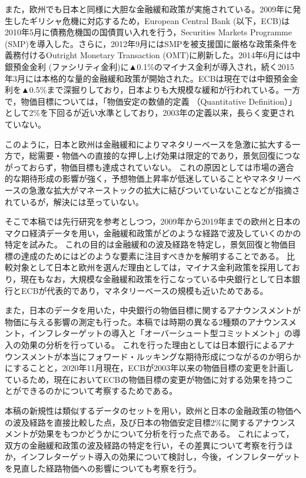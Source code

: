 \documentclass[12pt]{jarticle}
\begin{document}
{また，欧州でも日本と同様に大胆な金融緩和政策が実施されている。2009年に発生したギリシャ危機に対応するため，European Central Bank (以下，ECB)は2010年5月に債務危機国の国債買い入れを行う，Securities Markets Programme (SMP)を導入した。さらに，2012年9月にはSMPを被支援国に厳格な政策条件を義務付けるOutright Monetary Transaction (OMT)に刷新した。2014年6月には中銀預金金利 (ファシリティ金利)に▲0.1\%のマイナス金利が導入され，続く2015年3月には本格的な量的金融緩和政策が開始された。ECBは現在では中銀預金金利を▲0.5\%まで深掘りしており，日本よりも大規模な緩和が行われている。一方で，物価目標については，「物価安定の数値的定義 （Quantitative Definition）」として2\%を下回るが近い水準としており，2003年の定義以来，長らく変更されていない。

このように，日本と欧州は金融緩和によりマネタリーベースを急激に拡大する一方で，総需要・物価への直接的な押し上げ効果は限定的であり，景気回復につながっておらず，物価目標も達成されていない。
これの原因としては市場の適合的な期待形成の影響が強く，予想物価上昇率が低迷していることやマネタリーベースの急激な拡大がマネーストックの拡大に結びついていないことなどが指摘されているが，解決には至っていない。

そこで本稿では先行研究を参考としつつ，2009年から2019年までの欧州と日本のマクロ経済データを用い，金融緩和政策がどのような経路で波及していくのかの特定を試みた。
これの目的は金融緩和の波及経路を特定し，景気回復と物価目標の達成のためにはどのような要素に注目すべきかを解明することである。
比較対象として日本と欧州を選んだ理由としては，マイナス金利政策を採用しており，現在もなお，大規模な金融緩和政策を行こなっている中央銀行として日本銀行とECBが代表的であり，マネタリーベースの規模も近いためである。

また，日本のデータを用いた，中央銀行の物価目標に関するアナウンスメントが物価に与える影響の測定も行った。本稿では時期の異なる2種類のアナウンスメント，インフレターゲットの導入と「オーバーシュート型コミットメント」の導入の効果の分析を行っている。
これを行った理由としては日本銀行によるアナウンスメントが本当にフォワード・ルッキングな期待形成につながるのか明らかにすることと，2020年11月現在，ECBが2003年以来の物価目標の変更を計画しているため，現在においてECBの物価目標の変更が物価に対する効果を持つことができるのかについて考察するためである。

本稿の新規性は類似するデータのセットを用い，欧州と日本の金融政策の物価への波及経路を直接比較した点，及び日本の物価安定目標2\%に関するアナウンスメントが効果をもつかどうかについて分析を行った点である。
これによって，双方の金融緩和政策の波及経路の特定を行い，その差異について考察を行うほか，インフレターゲット導入の効果について検討し，今後，インフレターゲットを見直した経路物価への影響についても考察を行う。

}
\end{document}
